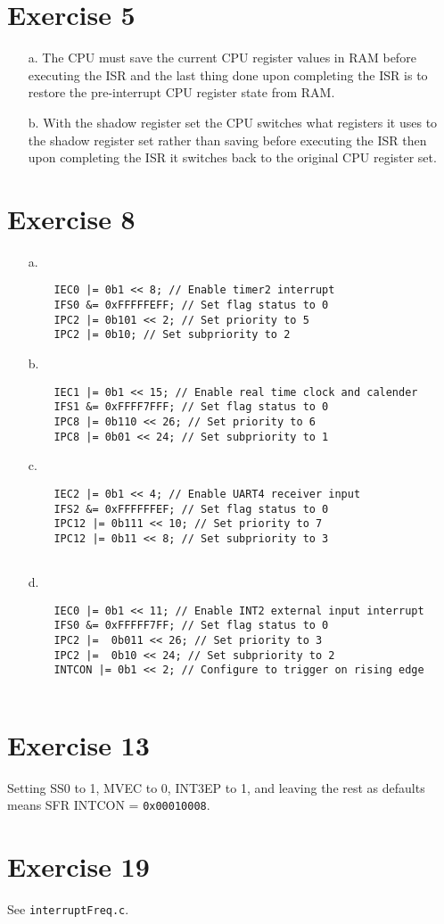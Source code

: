 \documentclass[12pt]{article}
\begin{document}
\section*{Exercise 5}
\begin{itemize}
    \item[a.] 
    The CPU must save the current CPU register values in RAM before executing the ISR and the last thing done upon completing the ISR is to restore the pre-interrupt CPU register state from RAM.

    \item[b.] 
    With the shadow register set the CPU switches what registers it uses to the shadow register set rather than saving before executing the ISR then upon completing the ISR it switches back to the original CPU register set.

\end{itemize}

\section*{Exercise 8}
\begin{itemize}
    \item[a.] 
    \begin{verbatim}
    IEC0 |= 0b1 << 8; // Enable timer2 interrupt
    IFS0 &= 0xFFFFFEFF; // Set flag status to 0
    IPC2 |= 0b101 << 2; // Set priority to 5
    IPC2 |= 0b10; // Set subpriority to 2
    \end{verbatim}

    \item[b.] 
    \begin{verbatim}
    IEC1 |= 0b1 << 15; // Enable real time clock and calender 
    IFS1 &= 0xFFFF7FFF; // Set flag status to 0
    IPC8 |= 0b110 << 26; // Set priority to 6
    IPC8 |= 0b01 << 24; // Set subpriority to 1
    \end{verbatim}

    \item[c.] 
    \begin{verbatim}
    IEC2 |= 0b1 << 4; // Enable UART4 receiver input
    IFS2 &= 0xFFFFFFEF; // Set flag status to 0
    IPC12 |= 0b111 << 10; // Set priority to 7
    IPC12 |= 0b11 << 8; // Set subpriority to 3
        
    \end{verbatim}

    \item[d.] 
    \begin{verbatim}
    IEC0 |= 0b1 << 11; // Enable INT2 external input interrupt
    IFS0 &= 0xFFFFF7FF; // Set flag status to 0
    IPC2 |=  0b011 << 26; // Set priority to 3
    IPC2 |=  0b10 << 24; // Set subpriority to 2
    INTCON |= 0b1 << 2; // Configure to trigger on rising edge 
        
    \end{verbatim}
\end{itemize}

\section*{Exercise 13}
Setting SS0 to 1, MVEC to 0, INT3EP to 1, and leaving the rest as defaults means SFR INTCON = \verb|0x00010008|.

\section*{Exercise 19}
See \verb|interruptFreq.c|.
\end{document}
